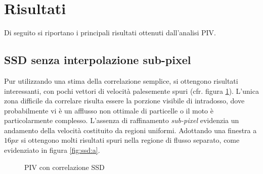 \documentclass[a4paper]{article}
\begin{document}
\section{Risultati}

Di seguito si riportano i principali risultati ottenuti dall'analisi PIV.

\subsection{SSD senza interpolazione sub-pixel}

Pur utilizzando una stima della correlazione semplice, si ottengono risultati interessanti, con pochi vettori di velocità palesemente spuri (cfr. figura \ref{fig:ssd}). L'unica zona difficile da correlare risulta essere la porzione visibile di intradosso, dove probabilmente vi è un afflusso non ottimale di particelle o il moto è particolarmente complesso. L'assenza di raffinamento \textit{sub-pixel} evidenzia un andamento della velocità costituito da regioni uniformi. Adottando una finestra a $16px$ si ottengono molti risultati spuri nella regione di flusso separato, come evidenziato in figura \ref{fig:ssd:a}.

\begin{figure}[h]
	\centering
	\caption{PIV con correlazione SSD}
	\label{fig:ssd}
\end{figure}
\end{document}
